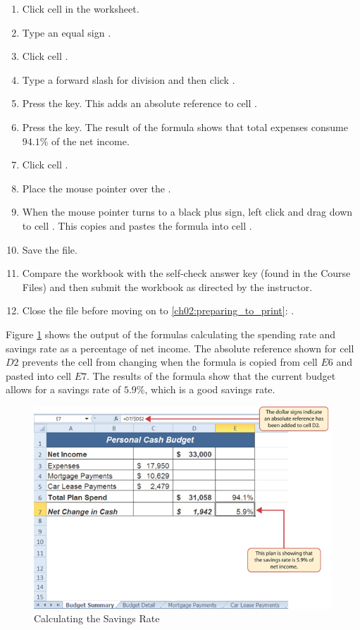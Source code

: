 \begin{enumerate}
	\item Click cell  in the  worksheet.
	\item Type an equal sign \fmtTyping{=}.
	\item Click cell .
	\item Type a forward slash \fmtTyping{/} for division and then click .
	\item Press the  key. This adds an absolute reference to cell .
	\item Press the  key. The result of the formula shows that total expenses consume $ 94.1\% $ of the net income.
	\item Click cell .
	\item Place the mouse pointer over the .
	\item When the mouse pointer turns to a black plus sign, left click and drag down to cell . This copies and pastes the formula into cell .
	\item Save the  file.
	\item Compare the workbook with the self-check answer key (found in the Course Files) and then submit the  workbook as directed by the instructor.
	\item Close the  file before moving on to \ref{ch02:preparing_to_print}: .
\end{enumerate}

Figure \ref{02:fig39} shows the output of the formulas calculating the spending rate and savings rate as a percentage of net income. The absolute reference shown for cell $ D2 $ prevents the cell from changing when the formula is copied from cell $ E6 $ and pasted into cell $ E7 $. The results of the formula show that the current budget allows for a savings rate of $ 5.9\% $, which is a good savings rate.

\begin{figure}[H]
	\centering
	\includegraphics[width=\maxwidth{.95\linewidth}]{gfx/ch02_fig39}
	\caption{Calculating the Savings Rate}
	\label{02:fig39}
\end{figure}

